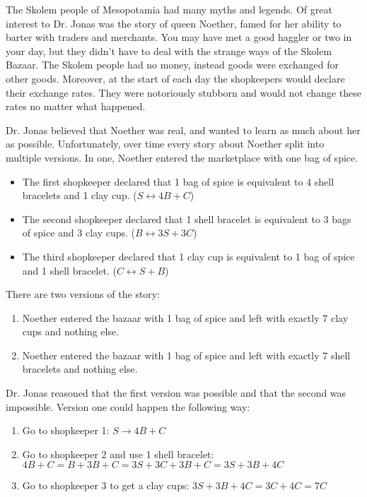 The Skolem people of Mesopotamia had many myths and legends.
Of great interest to Dr. Jonas was the story of queen Noether, famed for her ability to barter with traders and merchants.
You may have met a good haggler or two in your day, but they didn't have to deal with the strange ways of the Skolem Bazaar.
The Skolem people had no money, instead goods were exchanged for other goods.
Moreover, at the start of each day the shopkeepers would declare their exchange rates.
They were notoriously stubborn and would not change these rates no matter what happened.

Dr. Jonas believed that Noether was real, and wanted to learn as much about her as possible.
Unfortunately, over time every story about Noether split into multiple versions.
In one, Noether entered the marketplace with one bag of spice.
\begin{itemize}
  \item The first shopkeeper declared that 1 bag of spice is equivalent to 4 shell bracelets and 1 clay cup. (\(S \leftrightarrow 4B + C\))
  \item The second shopkeeper declared that 1 shell bracelet is equivalent to 3 bags of spice and 3 clay cups. (\(B \leftrightarrow 3S + 3C\))
  \item The third shopkeeper declared that 1 clay cup is equivalent to 1 bag of spice and 1 shell bracelet. (\(C \leftrightarrow S + B\))    
\end{itemize}
There are two versions of the story:
\begin{enumerate}
  \item Noether entered the bazaar with 1 bag of spice and left with exactly 7 clay cups and nothing else.
  \item Noether entered the bazaar with 1 bag of spice and left with exactly 7 shell bracelets and nothing else.
\end{enumerate}

Dr. Jonas reasoned that the first version was possible and that the second was impossible.
Version one could happen the following way:
\begin{enumerate}
  \item Go to shopkeeper 1: \(S \rightarrow 4B + C\)
  \item Go to shopkeeper 2 and use 1 shell bracelet: \(4B + C = B + 3B + C = 3S + 3C + 3B + C = 3S + 3B + 4C\)
  \item Go to shopkeeper 3 to get a clay cups: \(3S + 3B + 4C = 3C + 4C = 7C\)
  \end{enumerate}
  
